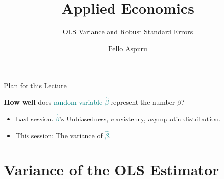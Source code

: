 \documentclass[11pt, aspectratio = 169]{beamer}
\title{Applied Economics}
\subtitle{OLS Variance and Robust Standard Errors}
\author{Pello Aspuru}
\date{}
\institute{Winter 2025/26}
\begin{document}
%

\maketitle

\begin{frame}{Plan for this Lecture}

\begin{center}
  \textbf{How well} does \textcolor{teal}{random variable} \textcolor{teal}{$\hat{\beta}$} represent the \alert{number} \alert{$\beta$}?
\end{center}
\pause
\vspace{-0.2cm}
    \begin{itemize}
        \item Last session: \textcolor{teal}{$\hat{\beta}$}'s Unbiasedness, consistency, asymptotic distribution.
        \item This session: The variance of \textcolor{teal}{$\hat{\beta}$}.
    \end{itemize}
\end{frame}

\section{Variance of the OLS Estimator}
\end{document}

